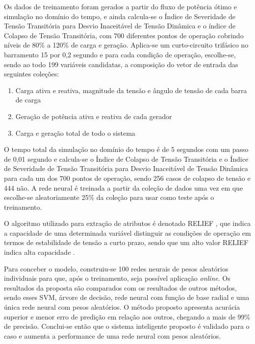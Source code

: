 \documentclass[12pt,oneside,a4paper,chapter=TITLE,section=TITLE,sumario=tradicional,english,brazil]{abntex2}
\begin{document}
Os dados de treinamento foram gerados a partir do fluxo de potência ótimo e simulação no domínio do tempo, e ainda calcula-se o Índice de Severidade de Tensão Transitória para Desvio Inaceitável de Tensão Dinâmica e o índice de Colapso de Tensão Transitória, com 700 diferentes pontos de operação cobrindo níveis de 80\% a 120\% de carga e geração. Aplica-se um curto-circuito trifásico no barramento 15 por 0,2 segundo e para cada condição de operação, escolhe-se, sendo ao todo 199 variáveis candidatas, a composição do vetor de entrada das seguintes coleções:\par 
\begin{enumerate}
\item Carga ativa e reativa, magnitude da tensão e ângulo de tensão de cada barra de carga
\item Geração de potência ativa e reativa de cada gerador
\item Carga e geração total de todo o sistema
\end{enumerate}
\par 
O tempo total da simulação no domínio do tempo é de 5 segundos com um passo de 0,01 segundo e calcula-se o Índice de Colapso de Tensão Transitória e o Índice de Severidade de Tensão Transitória para Desvio Inaceitável de Tensão Dinâmica para cada um dos 700 pontos de operação, sendo 256 casos de colapso de tensão e 444 não. A rede neural é treinada a partir da coleção de dados uma vez em que escolhe-se aleatoriamente 25\% da coleção para usar como teste após o treinamento. \par
O algoritmo utilizado para extração de atributos é denotado RELIEF \cite{zhang2012}, que indica a capacidade de uma determinada variável distinguir as condições de operação em termos de estabilidade de tensão a curto prazo, sendo que um alto valor RELIEF indica alta capacidade \cite{zhang2012}.\par
Para conceber o modelo, construiu-se 100  redes neurais de pesos aleatórios individuais para que, após o treinamento, seja possível aplicação \textit{online}. Os resultados da proposta são comparados com os resultados de outros métodos, sendo esses SVM, árvore de decisão, rede neural com função de base radial e uma única rede neural com pesos aleatórios. O método proposto apresenta acurácia superior e menor erro de predição em relação aos outros, chegando a mais de 99\% de precisão. Conclui-se então que o sistema inteligente proposto é validado para o caso e aumenta a performance de uma rede neural com pesos aleatórios.\par
\end{document}
